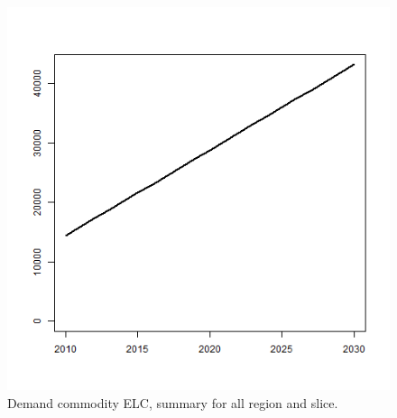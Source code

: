 \documentclass{article}
\begin{document}
\begin{figure}[H]
  \centering
  \includegraphics[width = 5in]{ELC_demand.png}
  \caption{Demand commodity ELC, summary for all region and slice.}
\end{figure}
\end{document}
